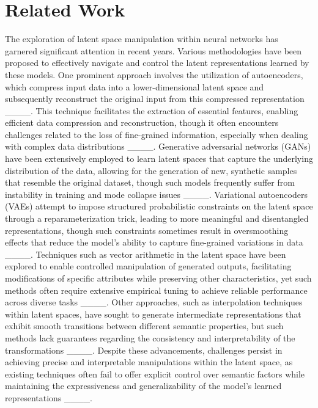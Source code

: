 \section{Related Work}
The exploration of latent space manipulation within neural networks has garnered significant attention in recent years. Various methodologies have been proposed to effectively navigate and control the latent representations learned by these models. One prominent approach involves the utilization of autoencoders, which compress input data into a lower-dimensional latent space and subsequently reconstruct the original input from this compressed representation ____. This technique facilitates the extraction of essential features, enabling efficient data compression and reconstruction, though it often encounters challenges related to the loss of fine-grained information, especially when dealing with complex data distributions ____. Generative adversarial networks (GANs) have been extensively employed to learn latent spaces that capture the underlying distribution of the data, allowing for the generation of new, synthetic samples that resemble the original dataset, though such models frequently suffer from instability in training and mode collapse issues ____. Variational autoencoders (VAEs) attempt to impose structured probabilistic constraints on the latent space through a reparameterization trick, leading to more meaningful and disentangled representations, though such constraints sometimes result in oversmoothing effects that reduce the model’s ability to capture fine-grained variations in data ____. Techniques such as vector arithmetic in the latent space have been explored to enable controlled manipulation of generated outputs, facilitating modifications of specific attributes while preserving other characteristics, yet such methods often require extensive empirical tuning to achieve reliable performance across diverse tasks ____. Other approaches, such as interpolation techniques within latent spaces, have sought to generate intermediate representations that exhibit smooth transitions between different semantic properties, but such methods lack guarantees regarding the consistency and interpretability of the transformations ____. Despite these advancements, challenges persist in achieving precise and interpretable manipulations within the latent space, as existing techniques often fail to offer explicit control over semantic factors while maintaining the expressiveness and generalizability of the model’s learned representations ____. 

